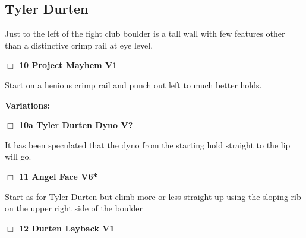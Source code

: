 \begin{multicols}{2}
\needspace{10em}
\subsection*{Tyler Durten}\label{bf:Tyler Durten}

Just to the left of the fight club boulder is a tall wall with few features other than a distinctive crimp rail at eye level.\\



\needspace{2em}
\label{rt:Project Mayhem}
\colorbox{green!20}{
\parbox{0.95\linewidth}{
\hspace{-1ex}\textbf{$\Box$
10 Project Mayhem V1+  
}}}
\begin{adjustwidth}{1.3em}{}			

Start on a henious crimp rail and punch out left to much better holds.
\end{adjustwidth}


\begin{adjustwidth}{0.5cm}{}				
\needspace{4em}
\textbf{Variations:} \newline

\needspace{2em}
\label{vr:Tyler Durten Dyno}
\colorbox{black!20}{
\parbox{0.95\linewidth}{
\hspace{-1ex}\textbf{$\Box$
10a Tyler Durten Dyno V?  
}}}
\begin{adjustwidth}{1.3em}{}			

It has been speculated that the dyno from the starting hold straight to the lip will go.
\end{adjustwidth}



\end{adjustwidth}


\needspace{2em}
\label{rt:Angel Face}
\colorbox{RoyalBlue!20}{
\parbox{0.95\linewidth}{
\hspace{-1ex}\textbf{$\Box$
11 Angel Face V6*  
}}}
\begin{adjustwidth}{1.3em}{}			

Start as for Tyler Durten but climb more or less straight up using the sloping rib on the upper right side of the boulder
\end{adjustwidth}




\needspace{2em}
\label{rt:Durten Layback}
\colorbox{green!20}{
\parbox{0.95\linewidth}{
\hspace{-1ex}\textbf{$\Box$
12 Durten Layback V1  
}}}
\begin{adjustwidth}{1.3em}{}			


\end{adjustwidth}
\end{multicols}
